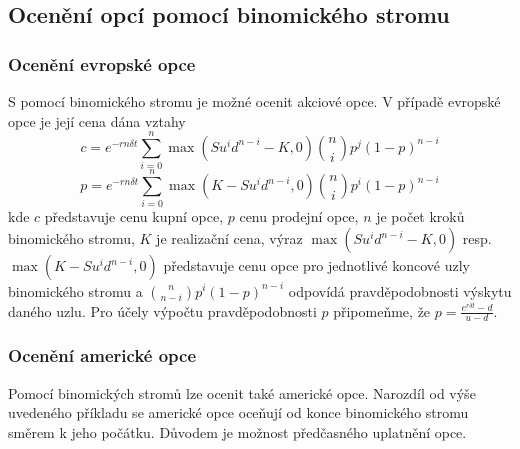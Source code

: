\documentclass[a4paper]{book}
\begin{document}
\subsection{Ocenění opcí pomocí binomického stromu}

\subsubsection{Ocenění evropské opce}

S pomocí binomického stromu je možné ocenit akciové opce. V případě evropské opce je její cena dána vztahy
\begin{equation*}
c = e^{-r n \delta t} \sum_{i=0}^n \max (Su^id^{n-i}-K,0)  \binom{n}{i} p^j(1-p)^{n-i}
\end{equation*}
\begin{equation*}
p = e^{-r n \delta t} \sum_{i=0}^n \max (K-Su^id^{n-i},0) \binom{n}{i} p^i(1-p)^{n-i}
\end{equation*}
kde $c$ představuje cenu kupní opce, $p$ cenu prodejní opce, $n$ je počet kroků binomického stromu, $K$ je realizační cena, výraz $\max(Su^id^{n-i}-K,0)$ resp. $\max(K-Su^id^{n-i},0)$ představuje cenu opce pro jednotlivé koncové uzly binomického stromu a $\binom{n}{n-i}p^i(1-p)^{n-i}$ odpovídá pravděpodobnosti výskytu daného uzlu. Pro účely výpočtu pravděpodobnosti $p$ připomeňme, že $p = \frac{e^{r\delta t}-d}{u-d}$.

\subsubsection{Ocenění americké opce}

Pomocí binomických stromů lze ocenit také americké opce. Narozdíl od výše uvedeného příkladu se americké opce oceňují od konce binomického stromu směrem k jeho počátku. Důvodem je možnost předčasného uplatnění opce.
\end{document}
